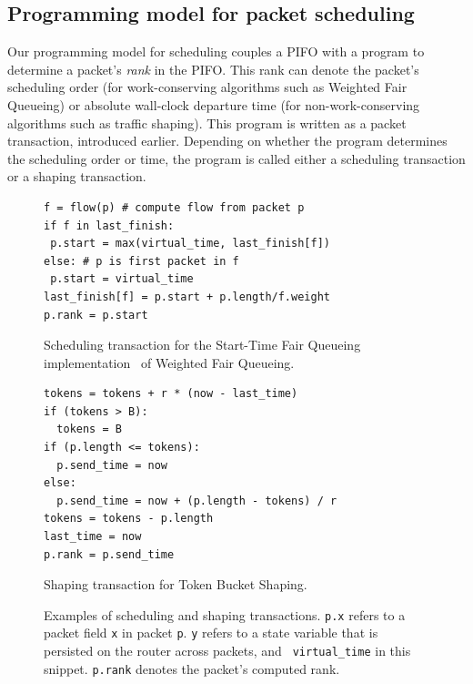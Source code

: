 \subsection{Programming model for packet scheduling} Our programming model for
scheduling couples a PIFO with a program to determine a packet's {\em rank} in
the PIFO. This rank can denote the packet's scheduling order (for
work-conserving algorithms such as Weighted Fair Queueing) or absolute
wall-clock departure time (for non-work-conserving algorithms such as traffic
shaping). This program is written as a packet transaction, introduced earlier.
Depending on whether the program determines the scheduling order or time, the
program is called either a scheduling transaction or a shaping transaction.

\begin{figure}
\begin{minipage}[!h]{0.48\textwidth}
\vspace{0.4in}
\begin{lstlisting}[style=customcscriptsize]
f = flow(p) # compute flow from packet p
if f in last_finish:
 p.start = max(virtual_time, last_finish[f])
else: # p is first packet in f
 p.start = virtual_time
last_finish[f] = p.start + p.length/f.weight
p.rank = p.start
\end{lstlisting}
\caption{Scheduling transaction for the Start-Time Fair Queueing
implementation~\cite{stfq} of Weighted Fair Queueing.}
\label{fig:wfq_trans}
\hfill
\end{minipage}
\begin{minipage}[!h]{0.48\textwidth}
\begin{lstlisting}[style=customcscriptsize]
tokens = tokens + r * (now - last_time)
if (tokens > B):
  tokens = B
if (p.length <= tokens):
  p.send_time = now
else:
  p.send_time = now + (p.length - tokens) / r
tokens = tokens - p.length
last_time = now
p.rank = p.send_time
\end{lstlisting}
\caption{Shaping transaction for Token Bucket Shaping.}
\label{fig:tbf_trans}
\end{minipage}
\caption{Examples of scheduling and shaping transactions. {\tt p.x} refers to a
packet field {\tt x} in packet {\tt p}.  {\tt y} refers to a state variable
that is persisted on the router across packets,  and {\tt
virtual\_time} in this snippet. {\tt p.rank} denotes the packet's computed
rank.}
\end{figure}

